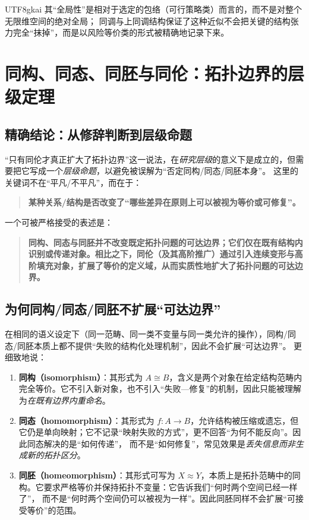 \documentclass[12pt]{article}
\begin{document}
\begin{CJK*}{UTF8}{gkai}
其“全局性”是相对于选定的包络（可行策略类）而言的，而不是对整个无限维空间的绝对全局；
同调与上同调结构保证了这种近似不会把关键的结构张力完全“抹掉”，而是以风险等价类的形式被精确地记录下来。


\section{同构、同态、同胚与同伦：拓扑边界的层级定理}

\subsection{精确结论：从修辞判断到层级命题}

“只有同伦才真正扩大了拓扑边界”这一说法，在\emph{研究层级}的意义下是成立的，但需要把它写成一个\emph{层级命题}，以避免被误解为“否定同构/同态/同胚本身”。
这里的关键词不在“平凡/不平凡”，而在于：
\begin{quote}
\textbf{某种关系/结构是否改变了“哪些差异在原则上可以被视为等价或可修复”。}
\end{quote}

一个可被严格接受的表述是：
\begin{quote}
\textbf{同构、同态与同胚并不改变既定拓扑问题的可达边界；它们仅在既有结构内识别或传递对象。相比之下，同伦（及其高阶推广）通过引入连续变形与高阶填充对象，扩展了等价的定义域，从而实质性地扩大了拓扑问题的可达边界。}
\end{quote}

\subsection{为何同构/同态/同胚不扩展“可达边界”}

在相同的语义设定下（同一范畴、同一类不变量与同一类允许的操作），同构/同态/同胚本质上都不提供“失败的结构化处理机制”，因此不会扩展“可达边界”。
更细致地说：
\begin{enumerate}
  \item \textbf{同构（isomorphism）}：其形式为 $A\cong B$，含义是两个对象在给定结构范畴内完全等价。它不引入新对象，也不引入“失败—修复”的机制，因此只能被理解为\emph{在既有边界内重命名}。
  \item \textbf{同态（homomorphism）}：其形式为 $f\colon A\to B$，允许结构被压缩或遗忘，但它仍是单向映射；它不记录“映射失败的方式”，更不回答“为何不能反向”。因此同态解决的是“如何传递”，
    而不是“如何修复”，常见效果是\emph{丢失信息而非生成新的拓扑区分}。
  \item \textbf{同胚（homeomorphism）}：其形式可写为 $X\approx Y$，本质上是拓扑范畴中的同构。它要求严格等价并保持拓扑不变量：它告诉我们“何时两个空间已经一样了”，
    而不是“何时两个空间仍可以被视为一样”。因此同胚同样不会扩展“可接受等价”的范围。
\end{enumerate}


\end{CJK*}
\end{document}
